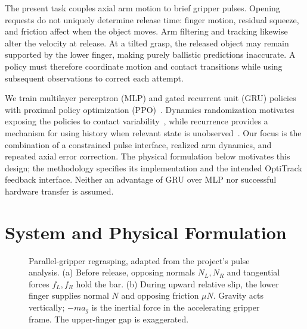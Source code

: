 \documentclass[letterpaper,10pt,conference]{ieeeconf}
\begin{document}
The present task couples axial arm motion to brief gripper pulses. Opening requests do not uniquely determine release time: finger motion, residual squeeze, and friction affect when the object moves. Arm filtering and tracking likewise alter the velocity at release. At a tilted grasp, the released object may remain supported by the lower finger, making purely ballistic predictions inaccurate. A policy must therefore coordinate motion and contact transitions while using subsequent observations to correct each attempt.

We train multilayer perceptron (MLP) and gated recurrent unit (GRU) policies with proximal policy optimization (PPO)~\cite{schulman2017ppo}. Dynamics randomization motivates exposing the policies to contact variability~\cite{peng2018dynamics,openai2020dexterous}, while recurrence provides a mechanism for using history when relevant state is unobserved~\cite{ni2022recurrent}. Our focus is the combination of a constrained pulse interface, realized arm dynamics, and repeated axial error correction. The physical formulation below motivates this design; the methodology specifies its implementation and the intended OptiTrack feedback interface. Neither an advantage of GRU over MLP nor successful hardware transfer is assumed.

\section{System and Physical Formulation}
\label{sec:physics}
\begin{figure}[t]
 \centering
 
 \caption{Parallel-gripper regrasping, adapted from the project's pulse analysis. (a) Before release, opposing normals $N_L,N_R$ and tangential forces $f_L,f_R$ hold the bar. (b) During upward relative slip, the lower finger supplies normal $N$ and opposing friction $\mu N$. Gravity acts vertically; $-ma_g$ is the inertial force in the accelerating gripper frame. The upper-finger gap is exaggerated.}
 \label{fig:gripper}
\end{figure}
\end{document}
